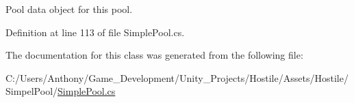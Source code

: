 Pool data object for this pool. 



Definition at line 113 of file Simple\-Pool.\-cs.



The documentation for this class was generated from the following file\-:\begin{DoxyCompactItemize}
\item 
C\-:/\-Users/\-Anthony/\-Game\-\_\-\-Development/\-Unity\-\_\-\-Projects/\-Hostile/\-Assets/\-Hostile/\-Simpel\-Pool/\hyperlink{_simple_pool_8cs}{Simple\-Pool.\-cs}\end{DoxyCompactItemize}

